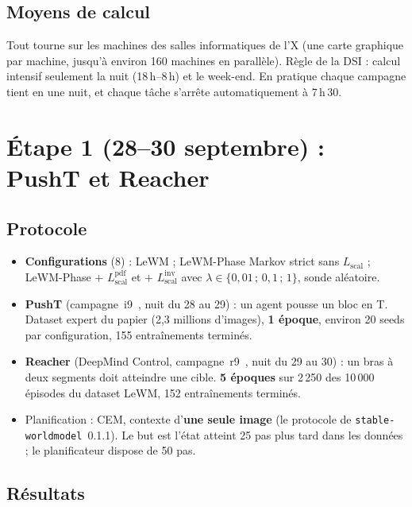 \documentclass[11pt,a4paper]{article}
\newcommand{\og}{\guillemotleft\,\ignorespaces}
\newcommand{\fg}{\unskip\,\guillemotright}
\newcommand{\Lscal}{L_{\mathrm{scal}}}
\begin{document}
\subsection{Moyens de calcul}

Tout tourne sur les machines des salles informatiques de l'X (une carte graphique par
machine, jusqu'à environ 160 machines en parallèle). Règle de la DSI : calcul intensif
seulement la nuit (18\,h--8\,h) et le week-end. En pratique chaque campagne tient en une nuit,
et chaque tâche s'arrête automatiquement à 7\,h\,30.

\section{Étape 1 (28--30 septembre) : PushT et Reacher}
\label{sec:i9}

\subsection{Protocole}

\begin{itemize}
  \item \textbf{Configurations} (8) : LeWM ; LeWM-Phase Markov strict sans $\Lscal$ ;
  LeWM-Phase + $\Lscal^{\mathrm{pdf}}$ et + $\Lscal^{\mathrm{inv}}$ avec
  $\lambda \in \{0{,}01\,;\,0{,}1\,;\,1\}$, sonde aléatoire.
  \item \textbf{PushT} (campagne \og i9 \fg{}, nuit du 28 au 29) : un agent pousse un bloc en
  T. Dataset expert du papier (2,3 millions d'images), \textbf{1 époque}, environ 20 seeds
  par configuration, 155 entraînements terminés.
  \item \textbf{Reacher} (DeepMind Control, campagne \og r9 \fg{}, nuit du 29 au 30) : un bras à
  deux segments doit atteindre une cible. \textbf{5 époques} sur 2\,250 des 10\,000 épisodes
  du dataset LeWM, 152 entraînements terminés.
  \item Planification : CEM, contexte d'\textbf{une seule image} (le protocole de
  \texttt{stable-worldmodel}~0.1.1). Le but est l'état atteint 25 pas plus tard dans les
  données ; le planificateur dispose de 50 pas.
\end{itemize}

\subsection{Résultats}
\end{document}
